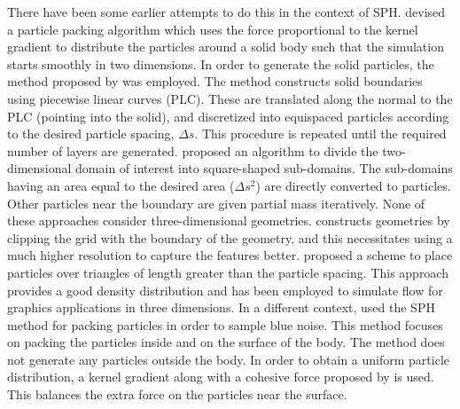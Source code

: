 \documentclass[preprint,12pt]{elsarticle}
\begin{document}
There have been some earlier attempts to do this in the context of SPH.
\citet{colagrossi2012particle} devised a particle packing algorithm which uses
the force proportional to the kernel gradient to distribute the particles
around a solid body such that the simulation starts smoothly in two
dimensions. In order to generate the solid particles, the method proposed by
\citet{marrone-deltasph:cmame:2011} was employed. The method constructs solid
boundaries using piecewise linear curves (PLC). These are translated along the
normal to the PLC (pointing into the solid), and discretized into equispaced
particles according to the desired particle spacing, $\Delta s$. This
procedure is repeated until the required number of layers are generated.
\citet{xiao2017new} proposed an algorithm to divide the two-dimensional domain
of interest into square-shaped sub-domains. The sub-domains having an area
equal to the desired area ($\Delta s^2$) are directly converted to particles.
Other particles near the boundary are given partial mass iteratively. None of
these approaches consider three-dimensional geometries.
\citet{dominguez2011development} constructs geometries by clipping the grid
with the boundary of the geometry, and this necessitates using a much higher
resolution to capture the features better. \citet{akinci2013coupling} proposed
a scheme to place particles over triangles of length greater than the particle
spacing. This approach provides a good density distribution and has been
employed to simulate flow for graphics applications in three dimensions. In a
different context, \citet{jiang2015blue} used the SPH method for packing
particles in order to sample blue noise. This method focuses on packing the
particles inside and on the surface of the body. The method does not generate
any particles outside the body. In order to obtain a uniform particle
distribution, a kernel gradient along with a cohesive force proposed by
\citet{akinci2013coupling} is used. This balances the extra force on the
particles near the surface.
\end{document}
